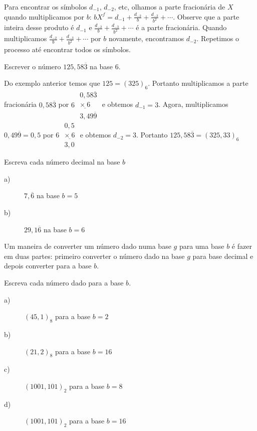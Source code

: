 Para encontrar os símbolos $d_{-1}$, $d_{-2}$, etc, olhamos a parte fracionária de $X$ quando multiplicamos por $b$:
$
bX^{f}=d_{-1}+\frac{d_{-2}}{b}+\frac{d_{-3}}{b^2}+\cdots.
$
Observe que a parte inteira desse produto é $d_{-1}$ e $\frac{d_{-2}}{b}+\frac{d_{-3}}{b^2}+\cdots$ é a parte fracionária. Quando multiplicamos $\frac{d_{-2}}{b}+\frac{d_{-3}}{b^2}+\cdots$ por $b$ novamente, encontramos $d_{-2}$. Repetimos o processo até encontrar todos os símbolos.
\begin{ex}Escrever o número $125,58\overline{3}$ na base $6$.

Do exemplo anterior temos que $125=(325)_6$. Portanto multiplicamos a parte fracionária $0,58\overline{3}$ por $6$
$
\begin{array}{l}
0,58\overline{3}\\
\underline{\times\ 6}\\
3,49 \overline{9}
\end{array}
$
e obtemos $d_{-1}=3$. Agora, multiplicamos $0,49\overline{9}=0,5$ por $6$
$
\begin{array}{l}
0,5\\
\underline{\times\ 6}\\
3,0
\end{array}
$
e obtemos $d_{-2}=3$. Portanto
$
125,58\overline{3}=(325,33)_6
$
\end{ex}
\begin{prob} Escreva cada número decimal na base $b$

\begin{description}
\item[a)] $7,\overline{6}$ na base $b=5$
\item[b)] $29,1\overline{6}$ na base $b=6$
\end{description}
\end{prob}

Um maneira de converter um número dado numa base $g$ para uma base $b$ é fazer em duas partes: primeiro converter o número dado na base $g$ para base decimal e depois converter para a base $b$.

\begin{prob} Escreva cada número dado para a base $b$.

\begin{description}
\item[a)] $(45,1)_8$ para a base $b=2$
\item[b)] $(21,2)_8$ para a base $b=16$
\item[c)] $(1001,101)_2$ para a base $b=8$
\item[d)] $(1001,101)_2$ para a base $b=16$
\end{description}
\end{prob}








